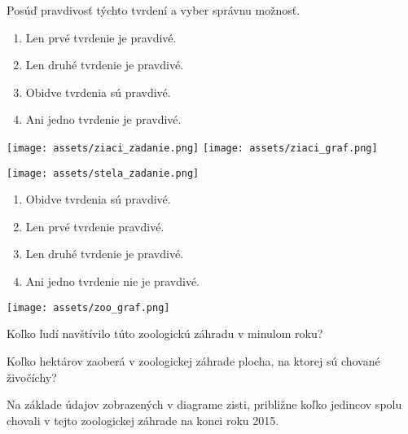 \begin{example}
	Posúď pravdivosť týchto tvrdení a vyber správnu možnosť.
	
	\begin{enumerate}
		\item Len prvé tvrdenie je pravdivé.
		\item Len druhé tvrdenie je pravdivé.
		\item Obidve tvrdenia sú pravdivé.
		\item Ani jedno tvrdenie je pravdivé.
	\end{enumerate}
\end{example}

\begin{example}
	 \begin{center}
	 	\texttt{[image: assets/ziaci\_zadanie.png]}
	 	\texttt{[image: assets/ziaci\_graf.png]}
	 \end{center}
\end{example}

\begin{example}
	\begin{center}
		\texttt{[image: assets/stela\_zadanie.png]}
	\end{center}
	
	\begin{enumerate}
		\item Obidve tvrdenia sú pravdivé.
		\item Len prvé tvrdenie pravdivé.
		\item Len druhé tvrdenie je pravdivé.
		\item Ani jedno tvrdenie nie je pravdivé.
	\end{enumerate}
\end{example}

\begin{center}
	\texttt{[image: assets/zoo\_graf.png]}
\end{center}

\begin{example}
	Koľko ľudí navštívilo túto zoologickú záhradu v minulom roku?
\end{example}

\begin{example}
	Koľko hektárov zaoberá v zoologickej záhrade plocha, na ktorej sú chované živočíchy?
\end{example}

\begin{example}
	Na základe údajov zobrazených v diagrame zisti, približne koľko jedincov  spolu chovali v tejto zoologickej záhrade na konci roku 2015.
\end{example}

